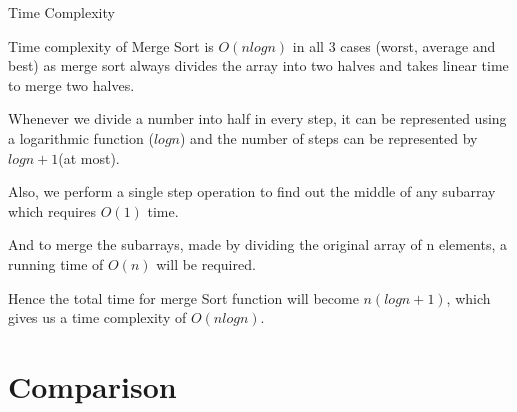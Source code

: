\documentclass{beamer}
\begin{document}
\begin{frame}{Time Complexity}
	
	Time complexity of Merge Sort is  \alert{$O(n log n)$} in all $3$ cases (worst, average and best) as merge sort always divides the array into two halves and takes linear time to merge two halves.\pause

	Whenever we divide a number into half in every step, it can be represented using a logarithmic function ($log n$) and the number of steps can be represented by $log n + 1$(at most).\pause

	Also, we perform a single step operation to find out the middle of any subarray which requires $O(1)$ time.\pause
	
	And to merge the subarrays, made by dividing the original array of n elements, a running time of $O(n)$ will be required.\pause
	
	Hence the total time for merge Sort function will become $n(log n + 1)$, which gives us a time complexity of \alert{$O(nlog n)$}.
	
\end{frame}

\section{Comparison}
  
\end{document}

